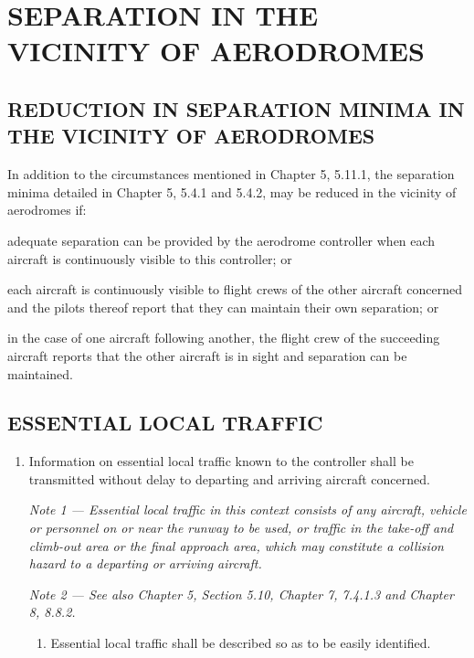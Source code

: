 \documentclass[../main.tex]{subfiles}
\begin{document}
    \thispagestyle{1page}
    
    \section[Separation in the Vicinity of Aerodromes]{\texorpdfstring{SEPARATION IN THE VICINITY OF AERODROMES}{}}

    \subsection[Reduction in separation minima in the vicinity of aerodromes]{REDUCTION IN SEPARATION MINIMA IN \\ THE VICINITY OF AERODROMES}

    In addition to the circumstances mentioned in Chapter 5, 5.11.1, the separation minima detailed in Chapter 5, 5.4.1 and 5.4.2, may be reduced in the vicinity of aerodromes if:

    \begin{enumalph}
        \item adequate separation can be provided by the aerodrome controller when each aircraft is continuously visible to this controller; or
        \item each aircraft is continuously visible to flight crews of the other aircraft concerned and the pilots thereof report that they can maintain their own separation; or
        \item in the case of one aircraft following another, the flight crew of the succeeding aircraft reports that the other aircraft is in sight and separation can be maintained.
    \end{enumalph}

    \subsection[Essential local traffic]{ESSENTIAL LOCAL TRAFFIC}

    \begin{enumerate}[label=\arabic{section}.\arabic{subsection}.\arabic*]
        \item Information on essential local traffic known to the controller shall be transmitted without delay to departing and arriving aircraft concerned.

        \textit{Note 1 --- Essential local traffic in this context consists of any aircraft, vehicle or personnel on or near the runway to be used, or traffic in the take-off and climb-out area or the final approach area, which may constitute a collision hazard to a departing or arriving aircraft.}

        \textit{Note 2 --- See also Chapter 5, Section 5.10, Chapter 7, 7.4.1.3 and Chapter 8, 8.8.2.}

        \begin{enumerate}[label=\arabic{section}.\arabic{subsection}.\arabic{enumi}.\arabic*]
            \item Essential local traffic shall be described so as to be easily identified.
        \end{enumerate}
    \end{enumerate}
\end{document}
